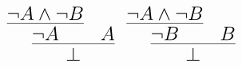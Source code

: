 \documentclass[14pt,border=2pt]{standalone}
\begin{document}
        $$
        \LARGE 

\begin{prooftree}
\hypo{\neg A \land \neg B}
\infer1{\neg A}
\hypo{A}
\infer2{\bot}
\end{prooftree}
\ \ 
\begin{prooftree}
\hypo{\neg A \land \neg B}
\infer1{\neg B}
\hypo{B}
\infer2{\bot}
\end{prooftree}
        $$
        
\end{document}
